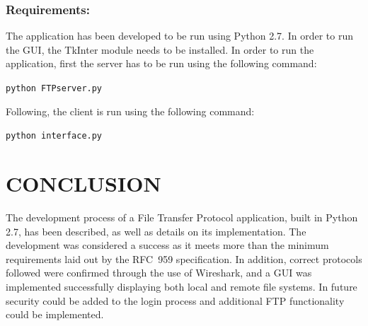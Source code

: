 \documentclass[10pt,twocolumn]{witseiepaper}
\begin{document}
\subsubsection*{Requirements: }
The application has been developed to be run using Python 2.7. In order to run the GUI, the TkInter module needs to be installed. In order to run the application, first the server has to be run using the following command:

\texttt{python FTPserver.py}

Following, the client is run using the following command:

\texttt{python interface.py}


\section{CONCLUSION}
The development process of a File Transfer Protocol application, built in Python 2.7, has been described, as well as details on its implementation. The development was considered a success as it meets more than the minimum requirements laid out by the RFC~959 specification. In addition, correct protocols followed were confirmed through the use of Wireshark, and a GUI was implemented successfully displaying both local and remote file systems. In future security could be added to the login process and additional FTP functionality could be implemented.

%



\newpage
\onecolumn
\end{document}
